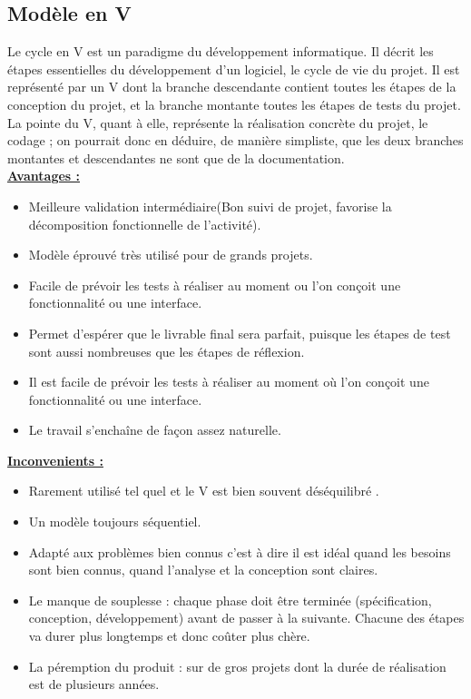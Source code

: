 \documentclass[11pt,a4paper,oneside]{book}
\begin{document}
	\subsection{Modèle en V}
	Le cycle en V est un paradigme du développement informatique. Il décrit les étapes essentielles
	du développement d’un logiciel, le cycle de vie du projet. Il est représenté par un V dont la branche
	descendante contient toutes les étapes de la conception du projet, et la branche montante toutes les étapes de tests du projet. La pointe du V, quant à elle, représente la réalisation concrète du projet,
	le codage ; on pourrait donc en déduire, de manière simpliste, que les deux branches montantes et
	descendantes ne sont que de la documentation.\\
	\underline{\textbf{Avantages :}}
	\begin{itemize}
		\item Meilleure validation intermédiaire(Bon suivi de projet, favorise la décomposition fonctionnelle de l’activité).
		\item Modèle éprouvé très utilisé pour de grands projets.
		\item  Facile de prévoir les tests à réaliser au moment ou l’on conçoit une fonctionnalité ou une
		interface.
		\item Permet d’espérer que le livrable final sera parfait, puisque les étapes de test sont aussi nombreuses que les étapes de réflexion.
		\item Il est facile de prévoir les tests à réaliser au moment où l’on conçoit une fonctionnalité ou
		une interface.
		\item Le travail s’enchaîne de façon assez naturelle.
	\end{itemize}
	\underline{\textbf{Inconvenients :}}
	\begin{itemize}
		\item Rarement utilisé tel quel et le V est bien souvent déséquilibré .
		\item Un modèle toujours séquentiel.
		\item Adapté aux problèmes bien connus c’est à dire il est idéal quand les besoins sont bien connus, quand l’analyse et la conception sont claires.
		\item Le manque de souplesse : chaque phase doit être terminée (spécification, conception, développement) avant de passer à la suivante. Chacune des étapes va durer plus longtemps et donc coûter plus chère.
		\item La péremption du produit : sur de gros projets dont la durée de réalisation est de plusieurs années.
	\end{itemize}
	
\end{document}
